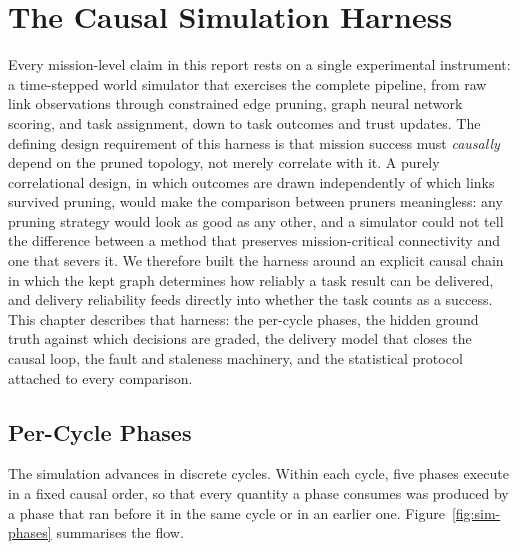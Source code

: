 \section{The Causal Simulation Harness}
\label{ch:simulation}

Every mission-level claim in this report rests on a single experimental
instrument: a time-stepped world simulator that exercises the complete
pipeline, from raw link observations through constrained edge pruning,
graph neural network scoring, and task assignment, down to task outcomes
and trust updates. The defining design requirement of this harness is that
mission success must \emph{causally} depend on the pruned topology, not
merely correlate with it. A purely correlational design, in which outcomes
are drawn independently of which links survived pruning, would make the
comparison between pruners meaningless: any pruning strategy would look as
good as any other, and a simulator could not tell the difference between
a method that preserves mission-critical connectivity and one that severs
it. We therefore built the harness around an explicit causal chain in
which the kept graph determines how reliably a task result can be
delivered, and delivery reliability feeds directly into whether the task
counts as a success. This chapter describes that harness: the per-cycle
phases, the hidden ground truth against which decisions are graded, the
delivery model that closes the causal loop, the fault and staleness
machinery, and the statistical protocol attached to every comparison.

\subsection{Per-Cycle Phases}

The simulation advances in discrete cycles. Within each cycle, five
phases execute in a fixed causal order, so that every quantity a phase
consumes was produced by a phase that ran before it in the same cycle or
in an earlier one. Figure~\ref{fig:sim-phases} summarises the flow.

